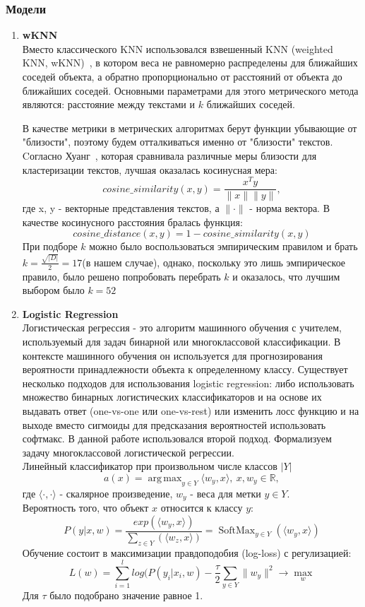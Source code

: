 \documentclass{article}
\DeclareMathOperator*{\argmax}{arg\,max}
\DeclareMathOperator*{\softmax}{SoftMax}
\begin{document}
\subsubsection{Модели}
\begin{enumerate}
    \item{\bfseries wKNN} \\
    Вместо классического KNN использовался взвешенный KNN (weighted KNN, wKNN)~\cite{dudani}, в котором веса не равномерно распределены для ближайших соседей объекта, а обратно пропорционально от расстояний от объекта до ближайших соседей. Основными параметрами для этого метрического метода являются: расстояние между текстами и $k$ ближайших соседей.

    В качестве метрики в метрических алгоритмах берут функции убывающие от "близости"{}, поэтому будем отталкиваться именно от "близости"{} текстов. Cогласно Хуанг~\cite{huang}, которая сравнивала различные меры близости для кластеризации текстов, лучшая оказалась косинусная мера:
    $$
    cosine\_similarity(x, y) = \frac{x^{T}y}{\|x\| \|y\|},
    $$ где x, y - векторные представления текстов, а $\|\cdot\|$ - норма вектора. В качестве косинусного расстояния бралась функция:
    $$
    cosine\_distance(x, y) = 1 - cosine\_similarity(x, y)
    $$
    При подборе $k$ можно было воспользоваться эмпирическим правилом и брать $k = \frac{\sqrt{|D|}}{2} = 17$(в нашем случае), однако, поскольку это лишь эмпирическое правило, было решено попробовать перебрать $k$ и оказалось, что лучшим выбором было $k = 52$
    
    \item{\bfseries Logistic Regression} \\
    Логистическая регрессия - это алгоритм машинного обучения с учителем, используемый для задач бинарной или многоклассовой классификации. В контексте машинного обучения он используется для прогнозирования вероятности принадлежности объекта к определенному классу. Существует несколько подходов для использования logistic regression: либо использовать множество бинарных логистических классификаторов и на основе их выдавать ответ (one-vs-one или one-vs-rest) или изменить лосс функцию и на выходе вместо сигмоиды для предсказания вероятностей использовать софтмакс. В данной работе использовался второй подход. Формализуем задачу многоклассовой логистической регрессии. \\
    
     Линейный классификатор при произвольном числе классов $|Y|$   
        $$
        a(x) = \argmax_{y \in Y}\langle w_y, x\rangle,\ x, w_y \in \mathbb{R},
        $$
        где $\langle \cdot, \cdot \rangle$ - скалярное произведение, $w_y$ - веса для метки $y \in Y$.\\
    Вероятность того, что объект $x$ относится к классу $y$:
        $$
        P(y|x, w) = \frac{exp(\langle w_y, x\rangle)}{\sum_{z \in Y}(\langle w_z, x\rangle)} = 
        \softmax_{y \in Y}(\langle w_y, x \rangle)
        $$
    Обучение состоит в максимизации правдоподобия (log-loss) с регулизацией:
    $$
        L(w) = \sum_{i=1}^{l}log(P(y_i|x_i, w) - \frac{\tau}{2}\sum_{y \in Y}\|w_y\|^2 \rightarrow \max_w
    $$
    Для $\tau$ было подобрано значение равное 1.


\end{enumerate}
\end{document}

